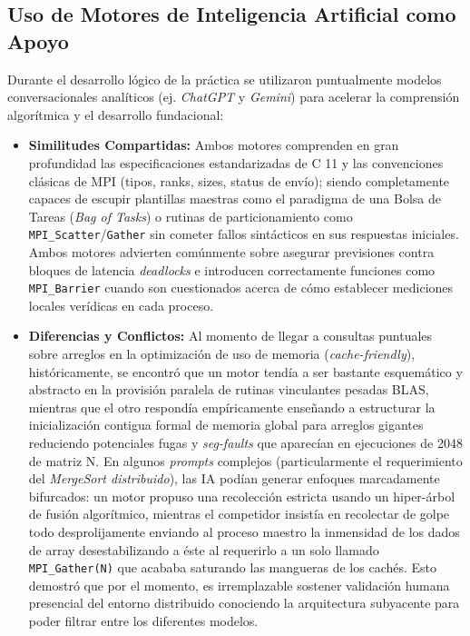 \documentclass[11pt,a4paper]{article}
\begin{document}
\subsection*{Uso de Motores de Inteligencia Artificial como Apoyo}
Durante el desarrollo lógico de la práctica se utilizaron puntualmente modelos conversacionales analíticos (ej. \textit{ChatGPT} y \textit{Gemini}) para acelerar la comprensión algorítmica y el desarrollo fundacional:
\begin{itemize}
    \item \textbf{Similitudes Compartidas:} Ambos motores comprenden en gran profundidad las especificaciones estandarizadas de C 11 y las convenciones clásicas de MPI (tipos, ranks, sizes, status de envío); siendo completamente capaces de escupir plantillas maestras como el paradigma de una Bolsa de Tareas (\textit{Bag of Tasks}) o rutinas de particionamiento como \texttt{MPI\_Scatter}/\texttt{Gather} sin cometer fallos sintácticos en sus respuestas iniciales. Ambos motores advierten comúnmente sobre asegurar previsiones contra bloques de latencia \textit{deadlocks} e introducen correctamente funciones como \texttt{MPI\_Barrier} cuando son cuestionados acerca de cómo establecer mediciones locales verídicas en cada proceso.
    \item \textbf{Diferencias y Conflictos:} Al momento de llegar a consultas puntuales sobre arreglos en la optimización de uso de memoria (\textit{cache-friendly}), históricamente, se encontró que un motor tendía a ser bastante esquemático y abstracto en la provisión paralela de rutinas vinculantes pesadas BLAS, mientras que el otro respondía empíricamente enseñando a estructurar la inicialización contigua formal de memoria global para arreglos gigantes reduciendo potenciales fugas y \textit{seg-faults} que aparecían en ejecuciones de 2048 de matriz N. En algunos \textit{prompts} complejos (particularmente el requerimiento del \textit{MergeSort distribuido}), las IA podían generar enfoques marcadamente bifurcados: un motor propuso una recolección estricta usando un hiper-árbol de fusión algorítmico, mientras el competidor insistía en recolectar de golpe todo desprolijamente enviando al proceso maestro la inmensidad de los dados de array desestabilizando a éste al requerirlo a un solo llamado \texttt{MPI\_Gather(N)} que acababa saturando las mangueras de los cachés. Esto demostró que por el momento, es irremplazable sostener validación humana presencial del entorno distribuido conociendo la arquitectura subyacente para poder filtrar entre los diferentes modelos.
\end{itemize}
\end{document}
